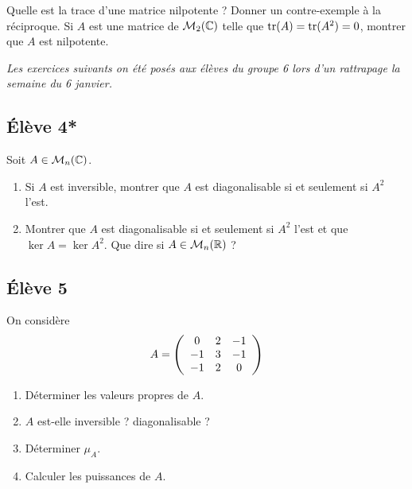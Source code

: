 \documentclass[10pt]{scrartcl}
\begin{document}
    \begin{exo}
        Quelle est la trace d'une matrice nilpotente ? 
        Donner un contre-exemple à la réciproque. 
        Si $A$ est une matrice de $\mathcal M_2(\operatorname{\mathbb C})$ 
        telle que $\operatorname{tr}(A)=\operatorname{tr}(A^2)=0$, montrer que $A$ 
        est nilpotente.
    \end{exo}

    \color{commented}\itshape 
    Les exercices suivants on été posés aux élèves du groupe 6 lors d'un rattrapage 
    la semaine du 6 janvier.
    \fontreset

    \subsection*{Élève 4*}
    \begin{exo}
        Soit $A\in\mathcal M_n(\operatorname{\mathbb C})$.
       \begin{enumerate}
        \item Si $A$ est inversible, montrer que $A$ 
        est diagonalisable si et seulement si $A^2$ l'est.
        \item Montrer que $A$ est diagonalisable si 
        et seulement si $A^2$ l'est et que $\ker A = \ker A^2$.
        Que dire si $A\in\mathcal M_n(\operatorname{\mathbb R})$ ?
       \end{enumerate}
    \end{exo}

    \subsection*{Élève 5}
    \begin{ccp}
        On considère 
        \[
            A=\left(\begin{array}{c c c}
                0 & 2 & -1\\
                -1 & 3 & -1\\
                -1 & 2 & 0
            \end{array}\right)
        \]
        \begin{enumerate}
            \item Déterminer les valeurs propres de $A$. 
            \item $A$ est-elle inversible ? diagonalisable ?
            \item Déterminer $\mu_A$.
            \item Calculer les puissances de $A$.
        \end{enumerate}
    \end{ccp}
\end{document}
